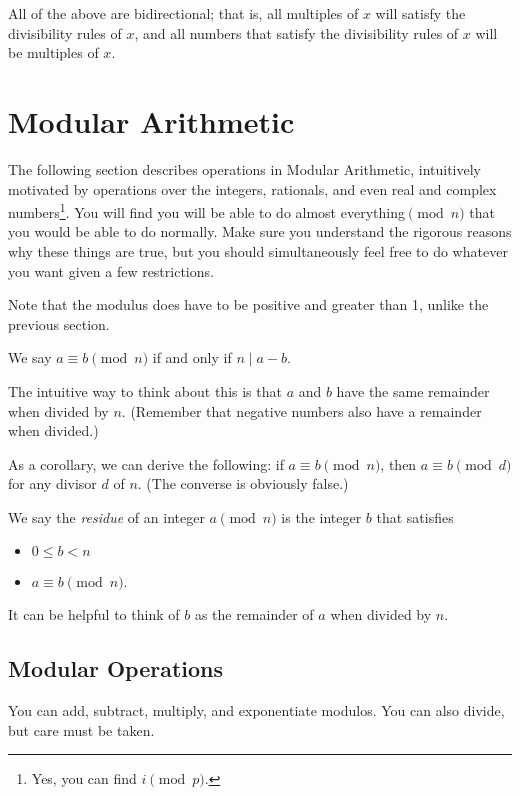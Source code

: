 \documentclass[mast]{lucky}
\begin{document}
All of the above are bidirectional; that is, all multiples of $x$ will satisfy the divisibility rules of $x$, and all numbers that satisfy the divisibility rules of $x$ will be multiples of $x$.
\section{Modular Arithmetic}
The following section describes operations in Modular Arithmetic, intuitively motivated by operations over the integers, rationals, and even real and complex numbers\footnote{Yes, you can find $i \pmod{p}$.}. You will find you will be able to do almost everything$\pmod{n}$ that you would be able to do normally. Make sure you understand the rigorous reasons why these things are true, but you should simultaneously feel free to do whatever you want given a few restrictions.

Note that the modulus does have to be positive and greater than 1, unlike the previous section.

\begin{defi}
We say $a\equiv b\pmod {n}$ if and only if $n\mid a-b.$
\end{defi}

The intuitive way to think about this is that $a$ and $b$ have the same remainder when divided by $n.$ (Remember that negative numbers also have a remainder when divided.)

As a corollary, we can derive the following: if $a\equiv b\pmod {n}$, then $a\equiv b\pmod {d}$ for any divisor $d$ of $n$. (The converse is obviously false.)

\begin{defi}
We say the \textit{residue} of an integer $a\pmod{n}$ is the integer $b$ that satisfies
\begin{itemize}
    \item $0\leq b<n$

    \item $a\equiv b\pmod{n}.$
\end{itemize}
\end{defi}

It can be helpful to think of $b$ as the remainder of $a$ when divided by $n.$

\subsection{Modular Operations}
You can add, subtract, multiply, and exponentiate modulos. You can also divide, but care must be taken.
\end{document}
